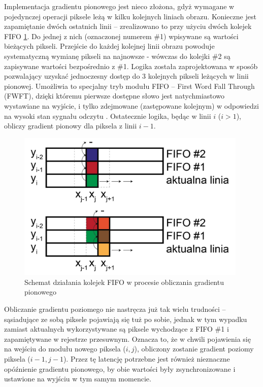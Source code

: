 Implementacja gradientu pionowego jest nieco złożona, gdyż wymagane w pojedynczej operacji piksele leżą w kilku kolejnych liniach obrazu. 
Konieczne jest zapamiętanie dwóch ostatnich linii -- zrealizowano to przy użyciu dwóch kolejek FIFO \ref{fig:fifo_gradient}.
Do jednej z nich (oznaczonej numerem \#1) wpisywane są wartości bieżących pikseli.
Przejście do każdej kolejnej linii obrazu powoduje systematyczną wymianę pikseli na najnowsze - wówczas do kolejki \#2 są zapisywane wartości bezpośrednio z \#1. %
Logika została zaprojektowana w sposób pozwalający uzyskać jednoczesny dostęp do 3 kolejnych pikseli leżących w linii pionowej. 
Umożliwia to specjalny tryb modułu FIFO -- First Word Fall Through (FWFT), dzięki któremu pierwsze dostępne słowo jest natychmiastowo wystawiane na wyjście, i tylko zdejmowane (zastępowane kolejnym) w odpowiedzi na wysoki stan sygnału odczytu \cite{FIFO}. %
Ostatecznie logika, będąc w linii $i$ ($i>1$), obliczy gradient pionowy dla piksela z linii $i-1$. %
\begin{figure}[h]
	\centering
	\includegraphics[width=11cm]{4_fifo_gradient.jpg}
	\caption{Schemat działania kolejek FIFO w procesie obliczania gradientu pionowego}
	\label{fig:fifo_gradient}
\end{figure}

Obliczanie gradientu poziomego nie nastręcza już tak wielu trudności -- sąsiadujące ze sobą piksele pojawiają się tuż po sobie, jednak w tym wypadku zamiast aktualnych wykorzystywane są piksele wychodzące z FIFO \#1 i zapamiętywane w rejestrze przesuwnym. 
Oznacza to, że w chwili pojawienia się na wejściu do modułu nowego piksela ($i,j$), obliczony zostanie gradient poziomy piksela ($i-1,j-1$). 
Przez tę latencję potrzebne jest również nieznaczne opóźnienie gradientu pionowego, by obie wartości były zsynchronizowane i ustawione na wyjściu w tym samym momencie.

